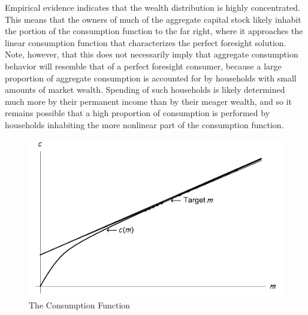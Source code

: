 Empirical evidence indicates that the wealth distribution is highly
concentrated.  This means that the owners of much of the aggregate
capital stock likely inhabit the portion of the consumption function
to the far right, where it approaches the linear consumption function
that characterizes the perfect foresight solution.  Note, however,
that this does not necessarily imply that aggregate consumption
behavior will resemble that of a perfect foresight consumer, because a
large proportion of aggregate consumption is accounted for by
households with small amounts of market wealth.  Spending of such
households is likely determined much more by their permanent income
than by their meager wealth, and so it remains possible that a high
proportion of consumption is performed by households inhabiting the
more nonlinear part of the consumption function.

\begin{figure}[ht]
\caption{The Consumption Function}
\centerline{\includegraphics[width=5.5in]{./Figures/PalgraveTargetPlot}}
\label{fig:ConsFunc}
\end{figure}

